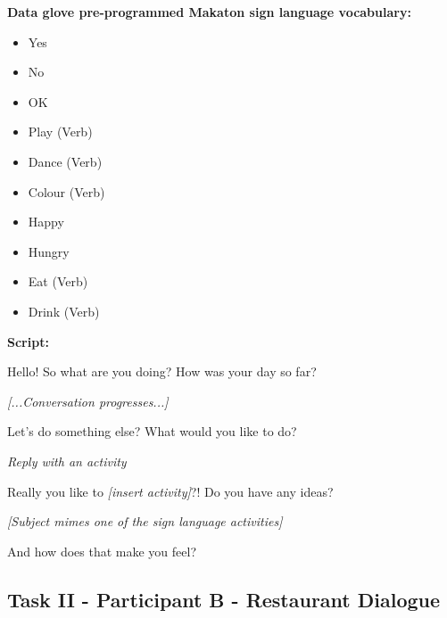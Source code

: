 \textbf{Data glove pre-programmed Makaton sign language vocabulary:}

\begin{itemize}
  \item Yes
  \item No
  \item OK
  \item Play (Verb)
  \item Dance (Verb)
  \item Colour (Verb)
  \item Happy
  \item Hungry
  \item Eat (Verb)
  \item Drink (Verb)
\end{itemize}

\textbf{Script:}

\begin{description}
  \item Hello! So what are you doing? How was your day so far?
  \item \textit{[...Conversation progresses...]}
  \item Let's do something else? What would you like to do?
  \item \textit{Reply with an activity}
  \item Really you like to \textit{[insert activity]}?! Do you have any ideas?
  \item \textit{[Subject mimes one of the sign language activities]}
  \item And how does that make you feel?
\end{description}

\subsection{Task II - Participant B - Restaurant Dialogue}

